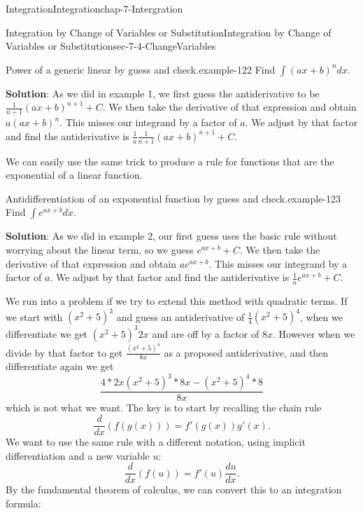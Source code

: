\documentclass[oneside,10pt,]{book}
\newcommand{\terminology}[1]{\textbf{#1}}
\numberwithin{equation}{section}
\begin{document}
\begin{chapterptx}{Integration}{}{Integration}{}{}{chap-7-Intergration}
\begin{sectionptx}{Integration by Change of Variables or Substitution}{}{Integration by Change of Variables or Substitution}{}{}{sec-7-4-ChangeVariables}
\begin{example}{Power of a generic linear by guess and check.}{example-122}
Find \(\int (ax+b)^n  dx\).%
\par
\hypertarget{p-2828}{}%
\terminology{Solution}:  As we did in example 1, we first guess the antiderivative to be \(\frac{1}{n+1} (ax+b)^{n+1}+C\). We then take the derivative of that expression and obtain \(a(ax+b)^n\).  This misses our integrand by a factor of \(a\).  We adjust by that factor and find the antiderivative is \(\frac{1}{a}  \frac{1}{n+1} (ax+b)^{n+1}+C\).%
\end{example}
\hypertarget{p-2829}{}%
We can easily use the same trick to produce a rule for functions that are the exponential of a linear function.%
\begin{example}{Antidifferentiation of an exponential function by guess and check.}{example-123}%
\hypertarget{p-2830}{}%
Find \(\int e^{ax+b}  dx\).%
\par
\hypertarget{p-2831}{}%
\terminology{Solution}:  As we did in example 2, our first guess uses the basic rule without worrying about the linear term, so we guess \(e^{ax+b}+C\). We then take the derivative of that expression and obtain \(ae^{ax+b}\).  This misses our integrand by a factor of \(a\).  We adjust by that factor and find the antiderivative is \(\frac{1}{a} e^{ax+b}+C\).%
\end{example}
\hypertarget{p-2832}{}%
We run into a problem if we try to extend this method with quadratic terms.  If we start with \((x^2+5)^3\) and guess an antiderivative of \(\frac{1}{4} (x^2+5)^4\), when we differentiate we get \((x^2+5)^3 2x\) and are off by a factor of \(8x\).  However when we divide by that factor to get \(\frac{(x^2+5)^4}{8x}\) as a proposed antiderivative, and then differentiate again we get%
%
\begin{equation*}
\frac{4*2x(x^2+5)^3*8x-(x^2+5)^4*8}{8x}
\end{equation*}
\hypertarget{p-2833}{}%
which is not what we want.  The key is to start by recalling the chain rule%
%
\begin{equation*}
\frac{d}{dx}  (f(g(x)))=f'(g(x))g'(x).
\end{equation*}
\hypertarget{p-2834}{}%
We want to use the same rule with a different notation, using implicit differentiation and a new variable \(u\):%
%
\begin{equation*}
\frac{d}{dx}  (f(u))=f'(u)\frac{du}{dx}.
\end{equation*}
\hypertarget{p-2835}{}%
By the fundamental theorem of calculus, we can convert this to an integration formula:%
%
\begin{equation*}

\end{equation*}
\end{sectionptx}
\end{chapterptx}
\end{document}
